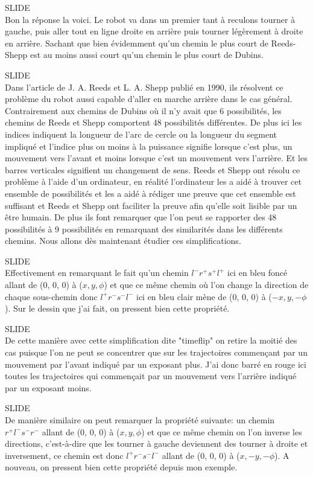 \documentclass[12pt,a4paper]{article}
\newcommand{\slide}{\vspace{0.6cm}SLIDE\\}
\begin{document}
	\slide
	
	Bon la réponse la voici. Le robot va dans un premier tant à reculons tourner à gauche, puis aller tout en ligne droite en arrière puis tourner légèrement à droite en arrière. Sachant que bien évidemment qu'un chemin le plus court de Reeds-Shepp est au moins aussi court qu'un chemin le plus court de Dubins.
	
	\slide
	
	Dans l'article de J. A. Reeds et L. A. Shepp publié en 1990, ils résolvent ce problème du robot aussi capable d'aller en marche arrière dans le cas général. Contrairement aux chemins de Dubins où il n'y avait que 6 possibilités, les chemins de Reeds et Shepp comportent 48 possibilités différentes. De plus ici les indices indiquent la longueur de l'arc de cercle ou la longueur du segment impliqué et l'indice plus ou moins à la puissance signifie lorsque c'est plus, un mouvement vers l'avant et moins lorsque c'est un mouvement vers l'arrière. Et les barres verticales signifient un changement de sens. Reeds et Shepp ont résolu ce problème à l'aide d'un ordinateur, en réalité l'ordinateur les a aidé à trouver cet ensemble de possibilités et les a aidé à rédiger une preuve que cet ensemble est suffisant et Reeds et Shepp ont faciliter la preuve afin qu'elle soit lisible par un être humain. De plus ils font remarquer que l'on peut se rapporter des 48 possibilités à 9 possibilités en remarquant des similarités dans les différents chemins. Nous allons dès maintenant étudier ces simplifications.
	
	\slide
	
	Effectivement en remarquant le fait qu'un chemin $l^-r^+s^+l^+$ ici en bleu foncé allant de (0, 0, 0) à ($x, y, \phi$) et que ce même chemin où l'on change la direction de chaque sous-chemin donc $l^+r^-s^-l^-$ ici en bleu clair mène de (0, 0, 0) à ($-x,y,-\phi$). Sur le dessin que j'ai fait, on pressent bien cette propriété.
	
	\slide
	
	De cette manière avec cette simplification dite "timeflip" on retire la moitié des cas puisque l'on ne peut se concentrer que sur les trajectoires commençant par un mouvement par l'avant indiqué par un exposant plus. J'ai donc barré en rouge ici toutes les trajectoires qui commençait par un mouvement vers l'arrière indiqué par un exposant moins.
	
	\slide
	
	De manière similaire on peut remarquer la propriété suivante: un chemin $r^+l^-s^-r^-$ allant de (0, 0, 0) à ($x, y, \phi$) et que ce même chemin on l'on inverse les directions, c'est-à-dire que les tourner à gauche deviennent des tourner à droite et inversement, ce chemin est donc $l^+r^-s^-l^-$ allant de (0, 0, 0) à ($x,-y,-\phi$). A nouveau, on pressent bien cette propriété depuis mon exemple.
	
\end{document}

